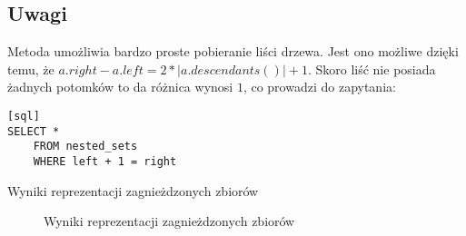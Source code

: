 


\subsection{Uwagi}

Metoda umożliwia bardzo proste pobieranie liści drzewa. 
Jest ono możliwe dzięki temu, że $a.right - a.left = 2 * |a.descendants()| + 1$. 
Skoro liść nie posiada żadnych potomków to da różnica wynosi $1$, co prowadzi do zapytania: 
\begin{verbatim}[sql]
SELECT *
    FROM nested_sets
    WHERE left + 1 = right
\end{verbatim}


\begin{table}[h]
  \caption{Wyniki reprezentacji zagnieżdzonych zbiorów}
   \begin{center}
   \end{center}
\end{table}

\begin{figure}[h]
  \caption{Wyniki reprezentacji zagnieżdzonych zbiorów}
  \label{fig:img_chart_nested}
  \begin{center}
  \end{center}
\end{figure}

